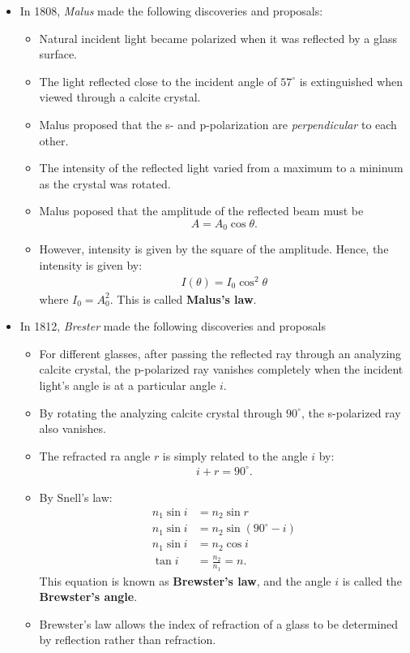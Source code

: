 \documentclass[10pt]{article}
\begin{document}
\begin{itemize}
		\item In 1808, \emph{Malus} made the following discoveries and proposals:
		\begin{itemize}
			\item Natural incident light became polarized when it was reflected by a glass surface.
			\item The light reflected close to the incident angle of $57^\circ$ is extinguished when viewed through a calcite crystal.
			\item Malus proposed that the s- and p-polarization are \emph{perpendicular} to each other.
			\item The intensity of the reflected light varied from a maximum to a mininum as the crystal was rotated.
			\item Malus poposed that the amplitude of the reflected beam must be
			$$ A = A_0 \cos\theta.$$
			\item However, intensity is given by the square of the amplitude.  Hence, the intensity is given by:
			\begin{align*}
				I(\theta) = I_0 \cos^2\theta
			\end{align*}
			where $I_0 = A_0^2$.  This is called \textbf{Malus's law}.
		\end{itemize}

		\item In 1812, \emph{Brester} made the following discoveries and proposals
		\begin{itemize}			
			\item For different glasses, after passing the reflected ray through an analyzing calcite crystal, the p-polarized ray vanishes completely when the incident light's angle is at a particular angle $i$.
			\item By rotating the analyzing calcite crystal through $90^\circ$, the s-polarized ray also vanishes.
			\item The refracted ra angle $r$ is simply related to the angle $i$ by:
			\begin{align*}
				i + r = 90^\circ.
			\end{align*}
			\item By Snell's law:
			\begin{align*}
				n_1 \sin i &= n_2 \sin r \\
				n_1 \sin i &= n_2 \sin (90^\circ - i) \\
				n_1 \sin i &= n_2 \cos i \\
				\tan i &= \frac{n_2}{n_1} = n.
			\end{align*}
			This equation is known as \textbf{Brewster's law}, and the angle $i$ is called the \textbf{Brewster's angle}.
			\item Brewster's law allows the index of refraction of a glass to be determined by reflection rather than refraction.
		\end{itemize}
	\end{itemize}
\end{document}
